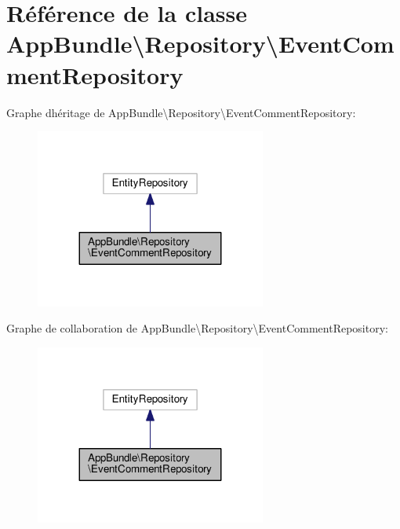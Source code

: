 \hypertarget{classAppBundle_1_1Repository_1_1EventCommentRepository}{}\section{Référence de la classe App\+Bundle\textbackslash{}Repository\textbackslash{}Event\+Comment\+Repository}
\label{classAppBundle_1_1Repository_1_1EventCommentRepository}


Graphe d\textquotesingle{}héritage de App\+Bundle\textbackslash{}Repository\textbackslash{}Event\+Comment\+Repository\+:\nopagebreak
\begin{figure}[H]
\begin{center}
\leavevmode
\includegraphics[width=215pt]{classAppBundle_1_1Repository_1_1EventCommentRepository__inherit__graph}
\end{center}
\end{figure}


Graphe de collaboration de App\+Bundle\textbackslash{}Repository\textbackslash{}Event\+Comment\+Repository\+:\nopagebreak
\begin{figure}[H]
\begin{center}
\leavevmode
\includegraphics[width=215pt]{classAppBundle_1_1Repository_1_1EventCommentRepository__coll__graph}
\end{center}
\end{figure}


